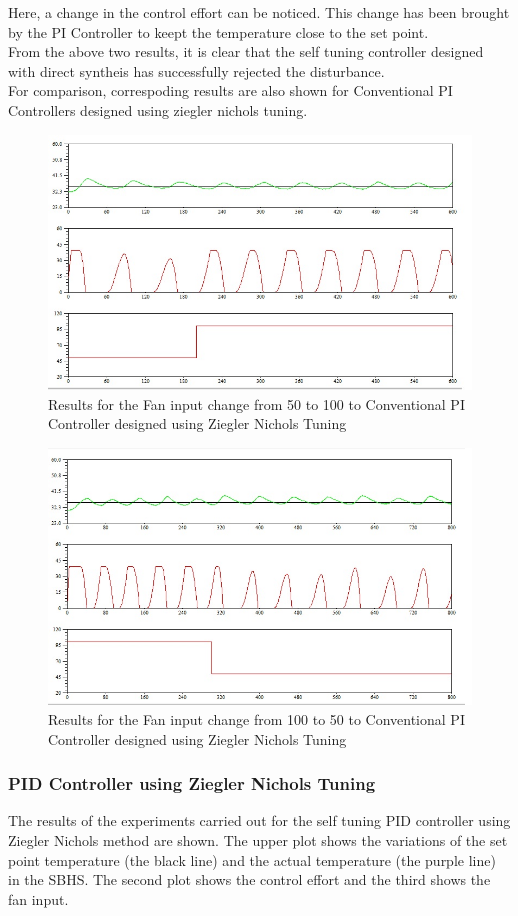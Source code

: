 Here, a change in the control effort can be noticed. This change has been brought by the PI Controller to keept the temperature close to the set point.\\
From the above two results, it is clear that the self tuning controller designed with direct syntheis has successfully rejected the disturbance.\\
\newpage
For comparison, correspoding results are also shown for Conventional PI Controllers designed using ziegler nichols tuning.

\begin{figure}[h]
	\centering
\includegraphics[width=.75\linewidth]{Vikas_self/report_tex/PID_results/Conventional_Tuning/Fan_disturbance/PI/step50to100.jpg}
	\caption{Results for the Fan input change from 50 to 100 to Conventional PI Controller designed using Ziegler Nichols Tuning}
\end{figure}

\begin{figure}[h]
	\centering
\includegraphics[width=.75\linewidth]{Vikas_self/report_tex/PID_results/Conventional_Tuning/Fan_disturbance/PI/step100to50.jpg}
	\caption{Results for the Fan input change from 100 to 50 to Conventional PI Controller designed using Ziegler Nichols Tuning}
\end{figure}


\newpage
\subsubsection{PID Controller using Ziegler Nichols Tuning}
The results of the experiments carried out for the self tuning PID controller using Ziegler Nichols method are shown. The upper plot shows the variations of the set point temperature (the black line) and the actual temperature (the purple line) in the SBHS. The second plot shows the control effort and the third shows the fan input.

